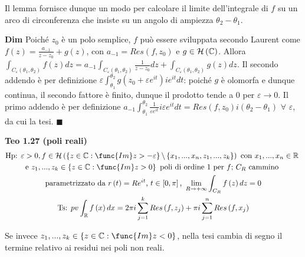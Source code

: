 \documentclass{article}
\begin{document}
Il lemma fornisce dunque un modo per calcolare il limite dell'integrale di $%
f $ su un arco di circonferenza che insiste su un angolo di ampiezza $\theta
_{2}-\theta _{1}$.

\textbf{Dim} Poich\'{e} $z_{0}$ \`{e} un polo semplice, $f$ pu\`{o} essere
sviluppata secondo Laurent come $f\left( z\right) =\frac{a_{-1}}{z-z_{0}}%
+g\left( z\right) $, con $a_{-1}=Res\left( f,z_{0}\right) $ e $g\in \mathcal{%
H}\left( 
\mathbb{C}
\right) $. Allora $\int_{C_{\varepsilon }\left( \theta _{1},\theta
_{2}\right) }f\left( z\right) dz=a_{-1}\int_{C_{\varepsilon }\left( \theta
_{1},\theta _{2}\right) }\frac{1}{z-z_{0}}dz+\int_{C_{\varepsilon }\left(
\theta _{1},\theta _{2}\right) }g\left( z\right) dz$. Il secondo addendo 
\`{e} per definizione $\varepsilon \int_{\theta _{1}}^{\theta _{2}}g\left(
z_{0}+\varepsilon e^{it}\right) ie^{it}dt$: poich\'{e} $g$ \`{e} olomorfa e
dunque continua, il secondo fattore \`{e} finito, dunque il prodotto tende a 
$0$ per $\varepsilon \rightarrow 0$. Il primo addendo \`{e} per definizione $%
a_{-1}\int_{\theta _{1}}^{\theta _{2}}\frac{1}{\varepsilon e^{it}}%
i\varepsilon e^{it}dt=Res\left( f,z_{0}\right) i\left( \theta _{2}-\theta
_{1}\right) $ $\forall $ $\varepsilon $, da cui la tesi. $\blacksquare $

\textbf{Teo 1.27 (poli reali)}%
\begin{gather*}
\text{Hp: }\varepsilon >0,f\in \mathcal{H}\left( \left\{ z\in 
\mathbb{C}
:\func{Im}z>-\varepsilon \right\} \backslash \left\{
x_{1},...,x_{n},z_{1},...,z_{k}\right\} \right) \text{ con }%
x_{1},...,x_{n}\in 
\mathbb{R}
\text{ } \\
\text{e }z_{1},...,z_{k}\in \left\{ z\in 
\mathbb{C}
:\func{Im}z>0\right\} \text{ poli di ordine }1\text{ per }f\text{; }C_{R}%
\text{ cammino } \\
\text{parametrizzato da }r\left( t\right) =Re^{it}\text{, }t\in \left[ 0,\pi %
\right] \text{, }\lim_{R\rightarrow +\infty }\int_{C_{R}}f\left( z\right)
dz=0 \\
\text{Ts: }pv\int_{%
\mathbb{R}
}f\left( x\right) dx=2\pi i\sum_{j=1}^{k}Res\left( f,z_{j}\right) +\pi
i\sum_{j=1}^{n}Res\left( f,x_{j}\right)
\end{gather*}

Se invece $z_{1},...,z_{k}\in \left\{ z\in 
\mathbb{C}
:\func{Im}z<0\right\} $, nella tesi cambia di segno il termine relativo ai
residui nei poli non reali.
\end{document}
